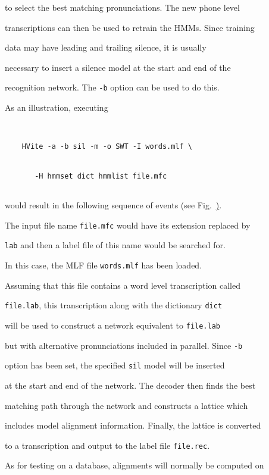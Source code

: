 to select the best matching pronunciations.  The new phone level


transcriptions can then be used to retrain the HMMs.  Since training


data may have leading and trailing silence, it is usually


necessary to insert a silence model at the start and end of the


recognition network.  The  \texttt{-b} option can be used to do this.





As an illustration, executing


\begin{verbatim}


    HVite -a -b sil -m -o SWT -I words.mlf \


       -H hmmset dict hmmlist file.mfc


\end{verbatim}


would result in the following sequence of events (see Fig.~\href{f:hvalign}).


The input file name \texttt{file.mfc} would have its extension replaced by


\texttt{lab} and then a label file of this name would be searched for.


In this case, the MLF file \texttt{words.mlf} has been loaded. 


Assuming that this file contains a word level transcription called


\texttt{file.lab}, this transcription along with the dictionary \texttt{dict}


will be used to construct a network equivalent to \texttt{file.lab}


but with alternative pronunciations included in parallel.  Since \texttt{-b}


option has been set, the specified \texttt{sil} model will be inserted


at the start and end of the network.  The decoder then finds the best


matching path through the network and constructs a lattice which


includes model alignment information.  Finally, the lattice is converted


to a transcription and output to the label file \texttt{file.rec}.


As for testing on a database, alignments will normally be computed on


